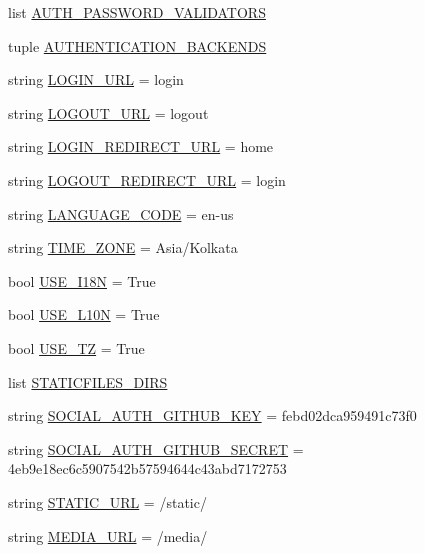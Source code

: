 \begin{DoxyCompactItemize}
list \hyperlink{namespacemysite_1_1settings_ae1a1bb374bc9383cde47414d4aaa23bc}{A\+U\+T\+H\+\_\+\+P\+A\+S\+S\+W\+O\+R\+D\+\_\+\+V\+A\+L\+I\+D\+A\+T\+O\+RS}
\item 
tuple \hyperlink{namespacemysite_1_1settings_a6224dd38a093d2571bb1f7cb15f252b8}{A\+U\+T\+H\+E\+N\+T\+I\+C\+A\+T\+I\+O\+N\+\_\+\+B\+A\+C\+K\+E\+N\+DS}
\item 
string \hyperlink{namespacemysite_1_1settings_a56cd1a05f65259228a292df83b316786}{L\+O\+G\+I\+N\+\_\+\+U\+RL} = \textquotesingle{}login\textquotesingle{}
\item 
string \hyperlink{namespacemysite_1_1settings_a27f4fe801a5e7861ab3f11909e5fe805}{L\+O\+G\+O\+U\+T\+\_\+\+U\+RL} = \textquotesingle{}logout\textquotesingle{}
\item 
string \hyperlink{namespacemysite_1_1settings_a626f4fd3c8256437791205c2ce7b0cdd}{L\+O\+G\+I\+N\+\_\+\+R\+E\+D\+I\+R\+E\+C\+T\+\_\+\+U\+RL} = \textquotesingle{}home\textquotesingle{}
\item 
string \hyperlink{namespacemysite_1_1settings_ad2470c2414ff293b7cdb55479a30e2e6}{L\+O\+G\+O\+U\+T\+\_\+\+R\+E\+D\+I\+R\+E\+C\+T\+\_\+\+U\+RL} = \textquotesingle{}login\textquotesingle{}
\item 
string \hyperlink{namespacemysite_1_1settings_a5aa2d89c65baaf7b41e64a82ed412029}{L\+A\+N\+G\+U\+A\+G\+E\+\_\+\+C\+O\+DE} = \textquotesingle{}en-\/us\textquotesingle{}
\item 
string \hyperlink{namespacemysite_1_1settings_a8166ffe52ad58ff798949b613c9b5b2c}{T\+I\+M\+E\+\_\+\+Z\+O\+NE} = \textquotesingle{}Asia/Kolkata\textquotesingle{}
\item 
bool \hyperlink{namespacemysite_1_1settings_ab15c018acd6d7b21aaa53653fec903ef}{U\+S\+E\+\_\+\+I18N} = True
\item 
bool \hyperlink{namespacemysite_1_1settings_af031ef2eb10f196cacefa65337e5a21d}{U\+S\+E\+\_\+\+L10N} = True
\item 
bool \hyperlink{namespacemysite_1_1settings_a34c32078df8ac40575a4828411c667d5}{U\+S\+E\+\_\+\+TZ} = True
\item 
list \hyperlink{namespacemysite_1_1settings_a205e94f007acd02d712fdf82cb1ea978}{S\+T\+A\+T\+I\+C\+F\+I\+L\+E\+S\+\_\+\+D\+I\+RS}
\item 
string \hyperlink{namespacemysite_1_1settings_a8907cc5e8b4fc5bf47b2222c91e75d86}{S\+O\+C\+I\+A\+L\+\_\+\+A\+U\+T\+H\+\_\+\+G\+I\+T\+H\+U\+B\+\_\+\+K\+EY} = \textquotesingle{}febd02dca959491c73f0\textquotesingle{}
\item 
string \hyperlink{namespacemysite_1_1settings_a9c7bd45a70ca12512b73e453713cf786}{S\+O\+C\+I\+A\+L\+\_\+\+A\+U\+T\+H\+\_\+\+G\+I\+T\+H\+U\+B\+\_\+\+S\+E\+C\+R\+ET} = \textquotesingle{}4eb9e18ec6c5907542b57594644c43abd7172753\textquotesingle{}
\item 
string \hyperlink{namespacemysite_1_1settings_a2aa5b2f0ed54dd3f8965ca2786f7fc27}{S\+T\+A\+T\+I\+C\+\_\+\+U\+RL} = \textquotesingle{}/static/\textquotesingle{}
\item 
string \hyperlink{namespacemysite_1_1settings_a2e12145dd0b032b6b22563f5edf9f920}{M\+E\+D\+I\+A\+\_\+\+U\+RL} = \textquotesingle{}/media/\textquotesingle{}
\end{DoxyCompactItemize}


